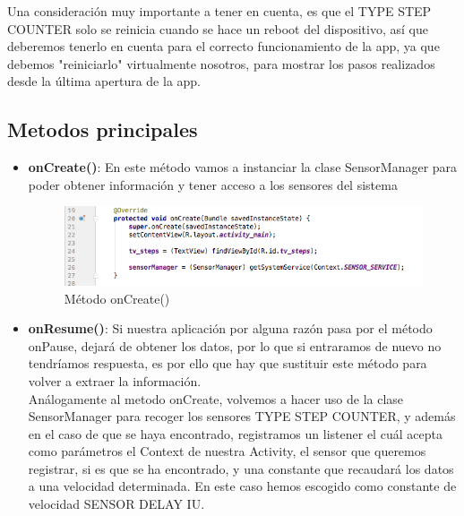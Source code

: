 \documentclass[12pt, a4paper, titlepage]{article}
\begin{document}
    	Una consideración muy importante a tener en cuenta, es que el TYPE STEP COUNTER solo se reinicia cuando se hace un reboot del dispositivo, así que deberemos tenerlo en cuenta para el correcto funcionamiento de la app, ya que debemos "reiniciarlo" virtualmente nosotros, para mostrar los pasos realizados desde la última apertura de la app.

    	\subsection{Metodos principales}
    	\begin{itemize}
    		\item \textbf{onCreate()}: En este método vamos a instanciar la clase SensorManager para poder obtener información y tener acceso a los sensores del sistema\newline\\

    		\begin{figure}[h!]
    			\begin{center}
    				\includegraphics[scale=0.55]{img/onCreate.png}
    				\caption{Método onCreate()}
    			\end{center}
    		\end{figure}
    		\item \textbf{onResume()}: Si nuestra aplicación por alguna razón pasa por el método onPause, dejará de obtener los datos, por lo que si entraramos de nuevo no tendríamos respuesta, es por ello que hay que sustituir este método para volver a extraer la información.\newline\\
    		Análogamente al metodo onCreate, volvemos a hacer uso de la clase SensorManager para recoger los sensores TYPE STEP COUNTER, y además en el caso de que se haya encontrado, registramos un listener el cuál acepta como parámetros el Context de nuestra Activity, el sensor que queremos registrar, si es que se ha encontrado, y una constante que recaudará los datos a una velocidad determinada. En este caso hemos escogido como constante de velocidad SENSOR DELAY IU. \newline\\


\end{itemize}
\end{document}
